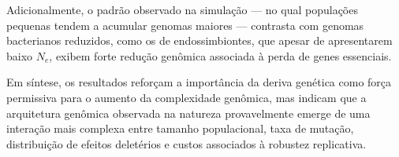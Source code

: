 Adicionalmente, o padrão observado na simulação — no qual populações pequenas tendem a acumular genomas maiores — contrasta com genomas bacterianos reduzidos, como os de endossimbiontes, que apesar de apresentarem baixo $N_e$, exibem forte redução genômica associada à perda de genes essenciais\cite{LuiselliEtAl2024}.

Em síntese, os resultados reforçam a importância da deriva genética como força permissiva para o aumento da complexidade genômica, mas indicam que a arquitetura genômica observada na natureza provavelmente emerge de uma interação mais complexa entre tamanho populacional, taxa de mutação, distribuição de efeitos deletérios e custos associados à robustez replicativa.
